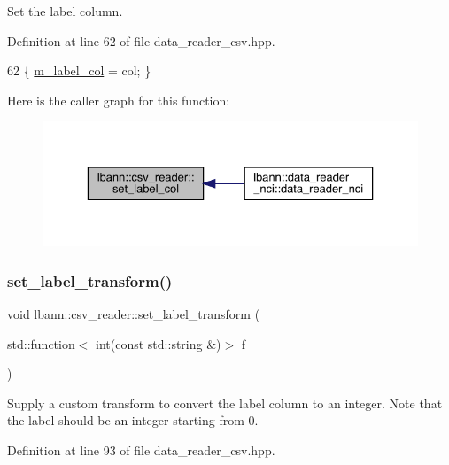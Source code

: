 Set the label column. 



Definition at line 62 of file data\+\_\+reader\+\_\+csv.\+hpp.


\begin{DoxyCode}
62 \{ \hyperlink{classlbann_1_1csv__reader_acc02e56c81421c4507f7178ca8461b04}{m\_label\_col} = col; \}
\end{DoxyCode}
Here is the caller graph for this function\+:\nopagebreak
\begin{figure}[H]
\begin{center}
\leavevmode
\includegraphics[width=329pt]{classlbann_1_1csv__reader_ad21bef8b7e1c1f9a03724475f987580c_icgraph}
\end{center}
\end{figure}
\mbox{\label{classlbann_1_1csv__reader_afa41685e0d81ab1b2b8e8739c94873cc}} 
\subsubsection{\texorpdfstring{set\+\_\+label\+\_\+transform()}{set\_label\_transform()}}
{\footnotesize\ttfamily void lbann\+::csv\+\_\+reader\+::set\+\_\+label\+\_\+transform (\begin{DoxyParamCaption}\item[{std\+::function$<$ int(const std\+::string \&)$>$}]{f }\end{DoxyParamCaption})\hspace{0.3cm}{\ttfamily [inline]}}

Supply a custom transform to convert the label column to an integer. Note that the label should be an integer starting from 0. 

Definition at line 93 of file data\+\_\+reader\+\_\+csv.\+hpp.


